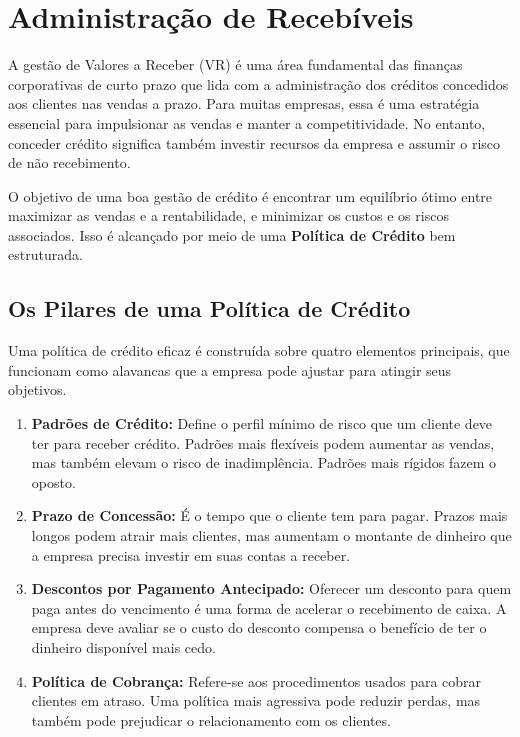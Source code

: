 \documentclass[
  a4paper,
]{book}
\providecommand{\tightlist}{%
  \setlength{\itemsep}{0pt}\setlength{\parskip}{0pt}}\usepackage{longtable,booktabs,array}
\begin{document}
\chapter{Administração de Recebíveis}\label{sec-credito}

A gestão de Valores a Receber (VR) é uma área fundamental das finanças
corporativas de curto prazo que lida com a administração dos créditos
concedidos aos clientes nas vendas a prazo. Para muitas empresas, essa é
uma estratégia essencial para impulsionar as vendas e manter a
competitividade. No entanto, conceder crédito significa também investir
recursos da empresa e assumir o risco de não recebimento.

O objetivo de uma boa gestão de crédito é encontrar um equilíbrio ótimo
entre maximizar as vendas e a rentabilidade, e minimizar os custos e os
riscos associados. Isso é alcançado por meio de uma \textbf{Política de
Crédito} bem estruturada.

\section{Os Pilares de uma Política de
Crédito}\label{os-pilares-de-uma-poluxedtica-de-cruxe9dito}

Uma política de crédito eficaz é construída sobre quatro elementos
principais, que funcionam como alavancas que a empresa pode ajustar para
atingir seus objetivos.

\begin{enumerate}
\def\labelenumi{\arabic{enumi}.}
\tightlist
\item
  \textbf{Padrões de Crédito:} Define o perfil mínimo de risco que um
  cliente deve ter para receber crédito. Padrões mais flexíveis podem
  aumentar as vendas, mas também elevam o risco de inadimplência.
  Padrões mais rígidos fazem o oposto.
\item
  \textbf{Prazo de Concessão:} É o tempo que o cliente tem para pagar.
  Prazos mais longos podem atrair mais clientes, mas aumentam o montante
  de dinheiro que a empresa precisa investir em suas contas a receber.
\item
  \textbf{Descontos por Pagamento Antecipado:} Oferecer um desconto para
  quem paga antes do vencimento é uma forma de acelerar o recebimento de
  caixa. A empresa deve avaliar se o custo do desconto compensa o
  benefício de ter o dinheiro disponível mais cedo.
\item
  \textbf{Política de Cobrança:} Refere-se aos procedimentos usados para
  cobrar clientes em atraso. Uma política mais agressiva pode reduzir
  perdas, mas também pode prejudicar o relacionamento com os clientes.
\end{enumerate}
\end{document}
